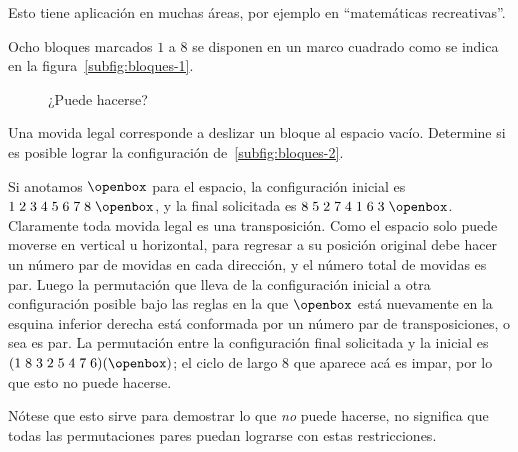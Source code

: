   Esto tiene aplicación en muchas áreas,
  por ejemplo en ``matemáticas recreativas''.
  \begin{example}
    Ocho bloques marcados \(1\) a \(8\) se disponen
    en un marco cuadrado
    como se indica en la figura~\ref{subfig:bloques-1}.
    \begin{figure}[htbp]
      \centering
      \qquad%
      \caption{¿Puede hacerse?}
      \label{fig:bloques}
    \end{figure}
    Una movida legal
    corresponde a deslizar un bloque al espacio vacío.
    Determine si es posible
    lograr la configuración de~\ref{subfig:bloques-2}.

    Si anotamos \(\openbox\) para el espacio,
    la configuración inicial
    es \(1\;2\;3\;4\;5\;6\;7\;8\;\openbox\),
    y la final solicitada es \(8\;5\;2\;7\;4\;1\;6\;3\;\openbox\).
    Claramente toda movida legal es una transposición.
    Como el espacio solo puede moverse en vertical u horizontal,
    para regresar a su posición original
    debe hacer un número par de movidas en cada dirección,
    y el número total de movidas es par.
    Luego la permutación que lleva de la configuración inicial
    a otra configuración posible bajo las reglas
    en la que \(\openbox\)
    está nuevamente en la esquina inferior derecha
    está conformada por un número par de transposiciones,
    o sea es par.
    La permutación entre la configuración final solicitada
    y la inicial es \((1\;8\;3\;2\;5\;4\;7\;6)(\openbox)\);
    el ciclo de largo \(8\) que aparece acá es impar,
    por lo que esto no puede hacerse.

    Nótese que esto sirve
    para demostrar lo que \emph{no} puede hacerse,
    no significa que todas las permutaciones pares puedan lograrse
    con estas restricciones.
  \end{example}

